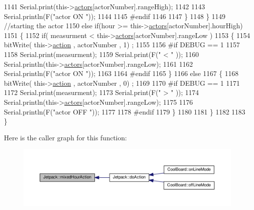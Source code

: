 \begin{DoxyCode}
1141                 Serial.print(this->\hyperlink{class_jetpack_a7e16d2f97837f9712a2e6de1c50d99db}{actors}[actorNumber].rangeHigh);
1142 
1143                 Serial.println(F(\textcolor{stringliteral}{"actor ON "}));
1144 
1145 \textcolor{preprocessor}{            #endif  }
1146                 
1147             \}
1148     \}
1149     \textcolor{comment}{//starting the actor}
1150     \textcolor{keywordflow}{else} \textcolor{keywordflow}{if}(hour >= this->\hyperlink{class_jetpack_a7e16d2f97837f9712a2e6de1c50d99db}{actors}[actorNumber].hourHigh)
1151     \{
1152             \textcolor{keywordflow}{if}( measurment < this->\hyperlink{class_jetpack_a7e16d2f97837f9712a2e6de1c50d99db}{actors}[actorNumber].rangeLow )
1153             \{
1154                 bitWrite( this->\hyperlink{class_jetpack_aca3142925a7b0834b34ae91d26af7765}{action} , actorNumber , 1) ;
1155 
1156 \textcolor{preprocessor}{            #if DEBUG == 1 }
1157 
1158                 Serial.print(measurment);
1159                 Serial.print(F(\textcolor{stringliteral}{" < "} ));
1160                 Serial.println(this->\hyperlink{class_jetpack_a7e16d2f97837f9712a2e6de1c50d99db}{actors}[actorNumber].rangeLow);
1161 
1162                 Serial.println(F(\textcolor{stringliteral}{"actor ON "}));
1163 
1164 \textcolor{preprocessor}{            #endif  }
1165             \}
1166             \textcolor{keywordflow}{else} 
1167             \{
1168                 bitWrite( this->\hyperlink{class_jetpack_aca3142925a7b0834b34ae91d26af7765}{action} , actorNumber , 0) ;
1169 
1170 \textcolor{preprocessor}{            #if DEBUG == 1 }
1171 
1172                 Serial.print(measurment);
1173                 Serial.print(F(\textcolor{stringliteral}{" > "} ));
1174                 Serial.println(this->\hyperlink{class_jetpack_a7e16d2f97837f9712a2e6de1c50d99db}{actors}[actorNumber].rangeLow);
1175 
1176                 Serial.println(F(\textcolor{stringliteral}{"actor OFF "}));
1177 
1178 \textcolor{preprocessor}{            #endif                  }
1179             \}
1180 
1181     \}
1182 
1183 \}
\end{DoxyCode}
Here is the caller graph for this function\+:\nopagebreak
\begin{figure}[H]
\begin{center}
\leavevmode
\includegraphics[width=350pt]{df/d1d/class_jetpack_ac1a49ab4867718cdb415ad74c2066b9d_icgraph}
\end{center}
\end{figure}
\mbox{\label{class_jetpack_a273dae1517b56f0242e28b8944edc26b}} 

